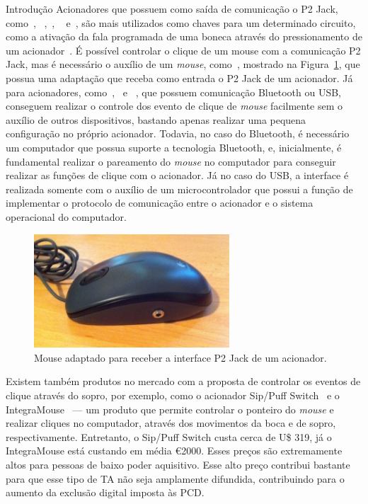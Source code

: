 \begin{chapter}{Introdução}
Acionadores que possuem como saída de comunicação o P2 Jack,
como~\cite{CandyCorn}, ~\cite{JellyBean},~\cite{MicroLight}, ~\cite{HoneyBee}
e~\cite{StringSwitch}, são mais utilizados como chaves para um determinado
circuito, como a ativação da fala programada de uma boneca através do
pressionamento de um acionador~\cite{ATswitchYT}. %
É possível controlar o clique de um mouse com a comunicação P2
Jack, mas é necessário o auxílio de um \textit{mouse}, como~\cite{MouseJack},
mostrado na Figura~\ref{fig:mouse}, que possua uma adaptação que receba como
entrada o P2 Jack de um acionador.  Já para acionadores,
como~\cite{Blue2},~\cite{FootPedal} e ~\cite{SipPuff}, que possuem comunicação
Bluetooth ou USB, conseguem realizar o controle dos evento de clique de
\textit{mouse} facilmente sem o auxílio de outros dispositivos, bastando apenas
realizar uma pequena configuração no próprio acionador. Todavia, no caso do
Bluetooth, é necessário um computador que possua suporte a tecnologia Bluetooth,
e, inicialmente, é fundamental realizar o pareamento do \textit{mouse} no
computador para conseguir realizar as funções de clique com o acionador. Já no
caso do USB, a interface é realizada somente com o auxílio de um
microcontrolador que possui a função de implementar o protocolo de comunicação
entre o acionador e o sistema operacional do computador.

\begin{figure}[!h]
	\centering
	\includegraphics[width=0.65\textwidth]{fig/mouse13}
	\caption{Mouse adaptado para receber a interface P2 Jack de um acionador.}
	\label{fig:mouse}
\end{figure}

Existem também produtos no mercado com a proposta de controlar os eventos de
clique através do sopro, por exemplo, como o acionador Sip/Puff
Switch~\cite{SipPuff} e o IntegraMouse~\cite{IntegraMouse} --- um produto que
permite controlar o ponteiro do \textit{mouse} e realizar cliques no computador,
através dos movimentos da boca e de sopro, respectivamente. Entretanto, o
Sip/Puff Switch custa cerca de U\$ 319, já o IntegraMouse está custando em média
\euro 2000. Esses preços são extremamente altos para pessoas de baixo poder
aquisitivo. Esse alto preço contribui bastante para que esse tipo de TA não seja
amplamente difundida, contribuindo para o aumento da exclusão digital imposta às
PCD.


\end{chapter}
